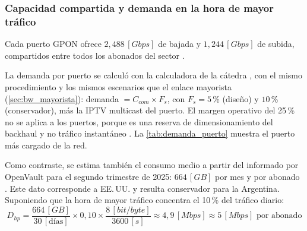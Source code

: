 \subsubsection{Capacidad compartida y demanda en la hora de mayor tráfico}
Cada puerto GPON ofrece $2{,}488 \, [Gbps]$ de bajada y $1{,}244 \, [Gbps]$ de subida, compartidos entre todos los abonados del sector \cite{g984_2}.

La demanda por puerto se calculó con la calculadora de la cátedra \cite{calc_catedra}, con el mismo procedimiento y los mismos escenarios que el enlace mayorista (\autoref{sec:bw_mayorista}): demanda $= C_{com} \times F_s$, con $F_s = 5$\,\% (diseño) y $10$\,\% (conservador), más la IPTV multicast del puerto. El margen operativo del 25\,\% no se aplica a los puertos, porque es una reserva de dimensionamiento del backhaul y no tráfico instantáneo \cite{doc_backhaul}. La \autoref{tab:demanda_puerto} muestra el puerto más cargado de la red.

Como contraste, se estima también el consumo medio a partir del informado por OpenVault para el segundo trimestre de 2025: $664 \, [GB]$ por mes y por abonado \cite{openvault}. Este dato corresponde a EE.\,UU. y resulta conservador para la Argentina. Suponiendo que la hora de mayor tráfico concentra el 10\,\% del tráfico diario:
\begin{equation}
    D_{hp} = \frac{664 \, [GB]}{30 \, [\text{días}]} \times 0{,}10 \times \frac{8 \, [bit/byte]}{3600 \, [s]} \approx 4{,}9 \, [Mbps] \approx 5 \, [Mbps] \text{ por abonado}
    \label{eq:demanda}
\end{equation}

